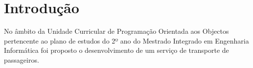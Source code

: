 \chapter{Introdução}
\label{cap:intro}

No âmbito da Unidade Curricular de Programação Orientada aos Objectos pertencente ao plano de estudos do 2º ano do Mestrado Integrado em Engenharia Informática foi proposto o desenvolvimento de um serviço de transporte de passageiros. 


